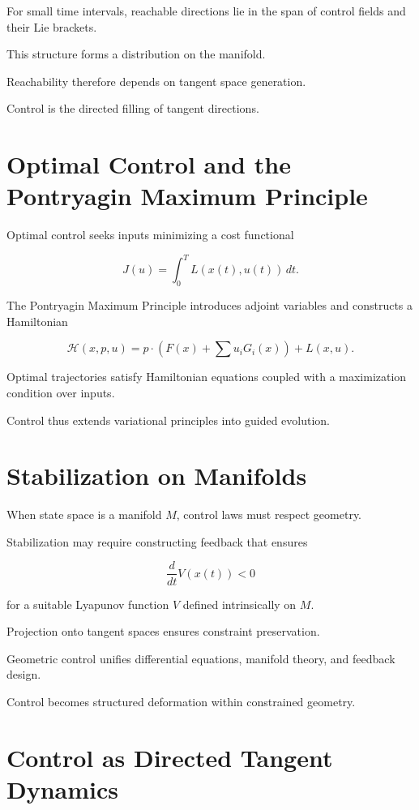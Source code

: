 \documentclass[12pt]{book}
\begin{document}
For small time intervals, reachable directions lie in the span of control fields and their Lie brackets.

This structure forms a distribution on the manifold.

Reachability therefore depends on tangent space generation.

Control is the directed filling of tangent directions.

\section{Optimal Control and the Pontryagin Maximum Principle}

Optimal control seeks inputs minimizing a cost functional

\[
J(u) = \int_0^T L(x(t), u(t))\, dt.
\]

The Pontryagin Maximum Principle introduces adjoint variables and constructs a Hamiltonian

\[
\mathcal{H}(x,p,u) = p \cdot (F(x) + \sum u_i G_i(x)) + L(x,u).
\]

Optimal trajectories satisfy Hamiltonian equations coupled with a maximization condition over inputs.

Control thus extends variational principles into guided evolution.

\section{Stabilization on Manifolds}

When state space is a manifold $M$, control laws must respect geometry.

Stabilization may require constructing feedback that ensures

\[
\frac{d}{dt} V(x(t)) < 0
\]

for a suitable Lyapunov function $V$ defined intrinsically on $M$.

Projection onto tangent spaces ensures constraint preservation.

Geometric control unifies differential equations, manifold theory, and feedback design.

Control becomes structured deformation within constrained geometry.

\section{Control as Directed Tangent Dynamics}
\end{document}

